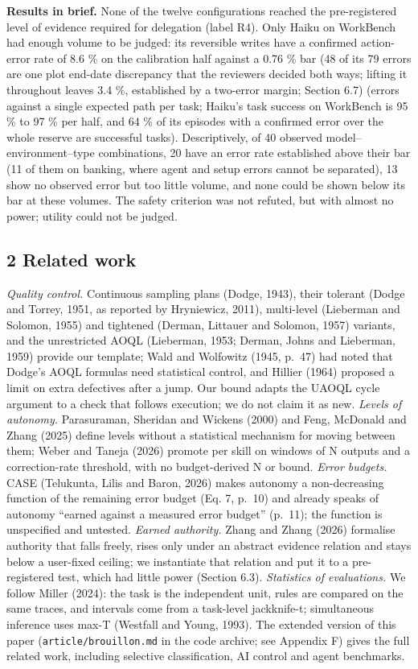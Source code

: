 \textbf{Results in brief.} None of the twelve configurations reached the pre-registered level of evidence required for delegation (label R4). Only Haiku on WorkBench had enough volume to be judged: its reversible writes have a confirmed action-error rate of 8.6 \% on the calibration half against a 0.76 \% bar (48 of its 79 errors are one plot end-date discrepancy that the reviewers decided both ways; lifting it throughout leaves 3.4 \%, established by a two-error margin; Section 6.7) (errors against a single expected path per task; Haiku's task success on WorkBench is 95 \% to 97 \% per half, and 64 \% of its episodes with a confirmed error over the whole reserve are successful tasks). Descriptively, of 40 observed model--environment--type combinations, 20 have an error rate established above their bar (11 of them on banking, where agent and setup errors cannot be separated), 13 show no observed error but too little volume, and none could be shown below its bar at these volumes. The safety criterion was not refuted, but with almost no power; utility could not be judged.

\subsection{2 Related work}\label{related-work}

\emph{Quality control.} Continuous sampling plans (Dodge, 1943), their tolerant (Dodge and Torrey, 1951, as reported by Hryniewicz, 2011), multi-level (Lieberman and Solomon, 1955) and tightened (Derman, Littauer and Solomon, 1957) variants, and the unrestricted AOQL (Lieberman, 1953; Derman, Johns and Lieberman, 1959) provide our template; Wald and Wolfowitz (1945, p.~47) had noted that Dodge's AOQL formulas need statistical control, and Hillier (1964) proposed a limit on extra defectives after a jump. Our bound adapts the UAOQL cycle argument to a check that follows execution; we do not claim it as new. \emph{Levels of autonomy.} Parasuraman, Sheridan and Wickens (2000) and Feng, McDonald and Zhang (2025) define levels without a statistical mechanism for moving between them; Weber and Taneja (2026) promote per skill on windows of N outputs and a correction-rate threshold, with no budget-derived N or bound. \emph{Error budgets.} CASE (Telukunta, Lilis and Baron, 2026) makes autonomy a non-decreasing function of the remaining error budget (Eq. 7, p.~10) and already speaks of autonomy ``earned against a measured error budget'' (p.~11); the function is unspecified and untested. \emph{Earned authority.} Zhang and Zhang (2026) formalise authority that falls freely, rises only under an abstract evidence relation and stays below a user-fixed ceiling; we instantiate that relation and put it to a pre-registered test, which had little power (Section 6.3). \emph{Statistics of evaluations.} We follow Miller (2024): the task is the independent unit, rules are compared on the same traces, and intervals come from a task-level jackknife-t; simultaneous inference uses max-T (Westfall and Young, 1993). The extended version of this paper (\texttt{article/\allowbreak{}brouillon.\allowbreak{}md} in the code archive; see Appendix F) gives the full related work, including selective classification, AI control and agent benchmarks.

